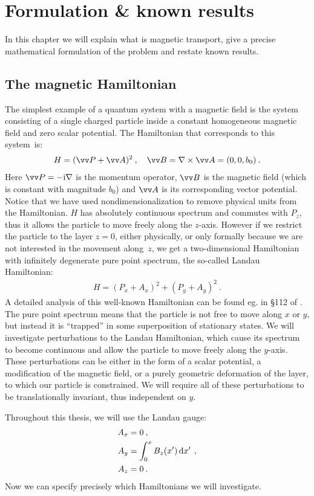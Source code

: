 \chapter{Formulation \& known results}
In this chapter we will explain what is magnetic transport, give a precise mathematical formulation of the problem and restate known results.

\section{The magnetic Hamiltonian}
The simplest example of a quantum system with a magnetic field is the system consisting of a single charged particle inside a constant homogeneous magnetic field and zero scalar potential. The Hamiltonian that corresponds to this system~is:
\begin{align*}
    H = (\vv P + \vv A)^2 \: , \quad
    \vv B = \nabla \times \vv A = (0, 0, b_0) \: .
\end{align*}
Here $\vv P = -\i \nabla$ is the momentum operator, $\vv B$ is the magnetic field (which is constant with magnitude $b_0$) and $\vv A$ is its corresponding vector potential. Notice that we have used nondimensionalization to remove physical units from the Hamiltonian. $H$ has absolutely continuous spectrum and commutes with $P_z$, thus it allows the particle to move freely along the $z$-axis. However if we restrict the particle to the layer $z=0$, either physically, or only formally because we are not interested in the movement along~$z$, we get a two-dimensional Hamiltonian with infinitely degenerate pure point spectrum, the so-called Landau Hamiltonian:
\begin{align*}
    H = (P_x + A_x)^2 + (P_y + A_y)^2 \: .
\end{align*}
A detailed analysis of this well-known Hamiltonian can be found eg. in §112 of \cite{LandauLifshitz3}. The pure point spectrum means that the particle is not free to move along $x$ or $y$, but instead it is “trapped” in some superposition of stationary states. We will investigate perturbations to the Landau Hamiltonian, which cause its spectrum to become continuous and allow the particle to move freely along the $y$-axis. These perturbations can be either in the form of a scalar potential, a modification of the magnetic field, or a purely geometric deformation of the layer, to which our particle is constrained. We will require all of these perturbations to be translationally invariant, thus independent on $y$.

Throughout this thesis, we will use the Landau gauge:
\begin{align*}
    A_x &= 0 \: , \\
    A_y &= \int_0^x B_z(x') \, \mathrm{d}x' \, \: , \\
    A_z &= 0 \: .
\end{align*}
Now we can specify precisely which Hamiltonians we will investigate.

